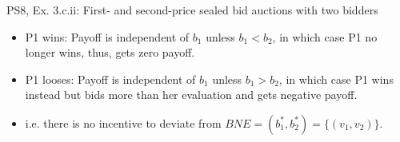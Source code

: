 \begin{frame}{PS8, Ex. 3.c.ii: First- and second-price sealed bid auctions with two bidders}
\begin{multicols}{2}
      \vspace{-18pt}
      \begin{itemize}
        \item[(ii)] P1 wins: Payoff is independent of $b_1$ unless $b_1<b_2$, in which case P1 no longer wins, thus, gets zero payoff.
        \item[] P1 looses: Payoff is independent of $b_1$ unless $b_1>b_2$, in which case P1 wins instead but bids more than her evaluation and gets negative payoff.
        \item[] i.e. there is no incentive to deviate from $BNE=(b_1^*,b_2^*)=\{(v_1,v_2)\}$.
      \end{itemize}
      \vfill\null
    \end{multicols}
\end{frame}


